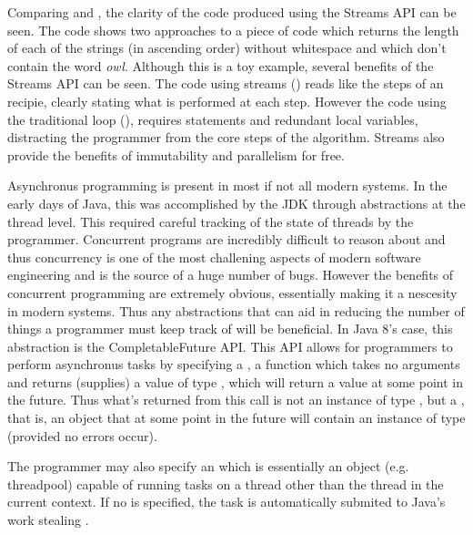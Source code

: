 Comparing  and , the clarity of the code produced using the Streams API can be seen. The code shows two approaches to a piece of code which returns the length of each of the strings (in ascending order) without whitespace and which don't contain the word \textit{owl}. Although this is a toy example, several benefits of the Streams API can be seen. The code using streams () reads like the steps of an recipie, clearly stating what is performed at each step. However the code using the traditional  loop (), requires  statements and redundant local variables, distracting the programmer from the core steps of the algorithm. Streams also provide the benefits of immutability and parallelism for free.






Asynchronus programming is present in most if not all modern systems. In the early days of Java, this was accomplished by the JDK through abstractions at the thread level. This required careful tracking of the state of threads by the programmer. Concurrent programs are incredibly difficult to reason about and thus concurrency is one of the most challening aspects of modern software engineering and is the source of a huge number of bugs. However the benefits of concurrent programming are extremely obvious, essentially making it a nescesity in modern systems. Thus any abstractions that can aid in reducing the number of things a programmer must keep track of will be beneficial. In Java 8's case, this abstraction is the CompletableFuture API. This API allows for programmers to perform asynchronus tasks by specifying a , a function which takes no arguments and returns (supplies) a value of type , which will return a value at some point in the future. Thus what's returned from this call is not an instance of type , but a , that is, an object that at some point in the future will contain an instance of type  (provided no errors occur). 

The programmer may also specify an  \cite{javaExecutor} which is essentially an object (e.g. threadpool) capable of running tasks on a thread other than the thread in the current context. If no  is specified, the task is automatically submited to Java's work stealing  \cite{javaForkJoinPool}. 

